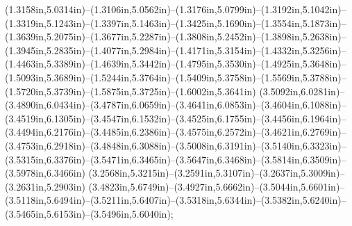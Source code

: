 (1.3158in,5.0314in)--(1.3106in,5.0562in)--(1.3176in,5.0799in)--(1.3192in,5.1042in)--(1.3319in,5.1243in)--(1.3397in,5.1463in)--(1.3425in,5.1690in)--(1.3554in,5.1873in)--(1.3639in,5.2075in)--(1.3677in,5.2287in)--(1.3808in,5.2452in)--(1.3898in,5.2638in)--(1.3945in,5.2835in)--(1.4077in,5.2984in)--(1.4171in,5.3154in)--(1.4332in,5.3256in)--(1.4463in,5.3389in)--(1.4639in,5.3442in)--(1.4795in,5.3530in)--(1.4925in,5.3648in)--(1.5093in,5.3689in)--(1.5244in,5.3764in)--(1.5409in,5.3758in)--(1.5569in,5.3788in)--(1.5720in,5.3739in)--(1.5875in,5.3725in)--(1.6002in,5.3641in) (3.5092in,6.0281in)--(3.4890in,6.0434in)--(3.4787in,6.0659in)--(3.4641in,6.0853in)--(3.4604in,6.1088in)--(3.4519in,6.1305in)--(3.4547in,6.1532in)--(3.4525in,6.1755in)--(3.4456in,6.1964in)--(3.4494in,6.2176in)--(3.4485in,6.2386in)--(3.4575in,6.2572in)--(3.4621in,6.2769in)--(3.4753in,6.2918in)--(3.4848in,6.3088in)--(3.5008in,6.3191in)--(3.5140in,6.3323in)--(3.5315in,6.3376in)--(3.5471in,6.3465in)--(3.5647in,6.3468in)--(3.5814in,6.3509in)--(3.5978in,6.3466in) (3.2568in,5.3215in)--(3.2591in,5.3107in)--(3.2637in,5.3009in)--(3.2631in,5.2903in) (3.4823in,5.6749in)--(3.4927in,5.6662in)--(3.5044in,5.6601in)--(3.5118in,5.6494in)--(3.5211in,5.6407in)--(3.5318in,5.6344in)--(3.5382in,5.6240in)--(3.5465in,5.6153in)--(3.5496in,5.6040in);
